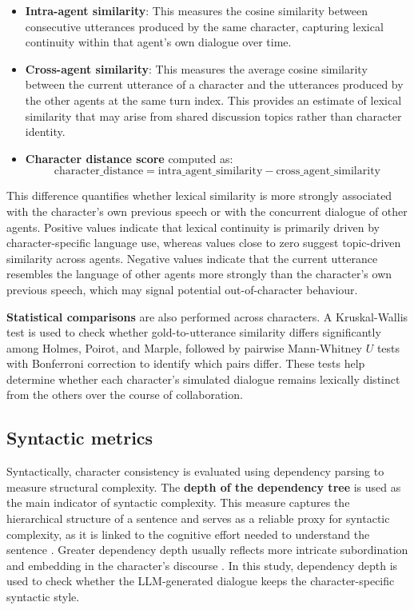 \documentclass{article}
\begin{document}
\begin{itemize}
    \item \textbf{Intra-agent similarity}: This measures the cosine similarity between consecutive utterances produced by the same character, capturing lexical continuity within that agent's own dialogue over time.
    \item \textbf{Cross-agent similarity}: This measures the average cosine similarity between the current utterance of a character and the utterances produced by the other agents at the same turn index. This provides an estimate of lexical similarity that may arise from shared discussion topics rather than character identity.
    \item \textbf{Character distance score} computed as:
    \begin{equation}
        \text{character\_distance} = \text{intra\_agent\_similarity} - \text{cross\_agent\_similarity}
        \label{eq:lexical_chardistance}
    \end{equation}
\end{itemize}

This difference quantifies whether lexical similarity is more strongly associated with the character's own previous speech or with the concurrent dialogue of other agents. Positive values indicate that lexical continuity is primarily driven by character-specific language use, whereas values close to zero suggest topic-driven similarity across agents. Negative values indicate that the current utterance resembles the language of other agents more strongly than the character's own previous speech, which may signal potential out-of-character behaviour.

\textbf{Statistical comparisons} are also performed across characters. A Kruskal-Wallis test is used to check whether gold-to-utterance similarity differs significantly among Holmes, Poirot, and Marple, followed by pairwise Mann-Whitney $U$ tests with Bonferroni correction to identify which pairs differ. These tests help determine whether each character's simulated dialogue remains lexically distinct from the others over the course of collaboration.

\subsection{Syntactic metrics} \label{sec:eval_syntacic}

Syntactically, character consistency is evaluated using dependency parsing to measure structural complexity. The \textbf{depth of the dependency tree} is used as the main indicator of syntactic complexity. This measure captures the hierarchical structure of a sentence and serves as a reliable proxy for syntactic complexity, as it is linked to the cognitive effort needed to understand the sentence \citep{gibson1998dependency, liu2008dependency}. Greater dependency depth usually reflects more intricate subordination and embedding in the character's discourse \citep{hudson2007dependency}. In this study, dependency depth is used to check whether the LLM-generated dialogue keeps the character-specific syntactic style.
\end{document}
